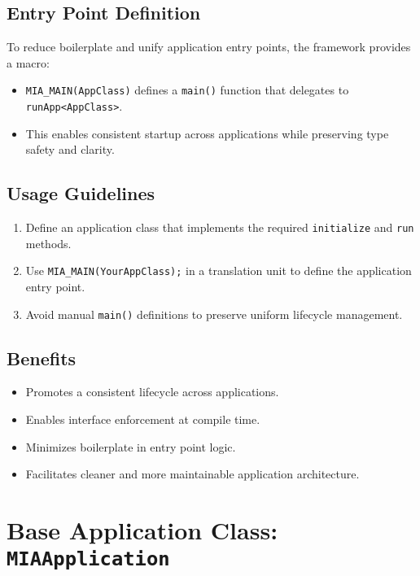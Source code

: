 \subsection*{Entry Point Definition}
To reduce boilerplate and unify application entry points, the framework provides a macro:
\begin{itemize}
	\item \texttt{MIA\_MAIN(AppClass)} defines a \texttt{main()} function that delegates to \texttt{runApp<AppClass>}.
	\item This enables consistent startup across applications while preserving type safety and clarity.
\end{itemize}

\subsection*{Usage Guidelines}
\begin{enumerate}
	\item Define an application class that implements the required \texttt{initialize} and \texttt{run} methods.
	\item Use \texttt{MIA\_MAIN(YourAppClass);} in a translation unit to define the application entry point.
	\item Avoid manual \texttt{main()} definitions to preserve uniform lifecycle management.
\end{enumerate}

\subsection*{Benefits}
\begin{itemize}
	\item Promotes a consistent lifecycle across applications.
	\item Enables interface enforcement at compile time.
	\item Minimizes boilerplate in entry point logic.
	\item Facilitates cleaner and more maintainable application architecture.
\end{itemize}











\section{Base Application Class: \texttt{MIAApplication}}
\label{sec:base-application}

